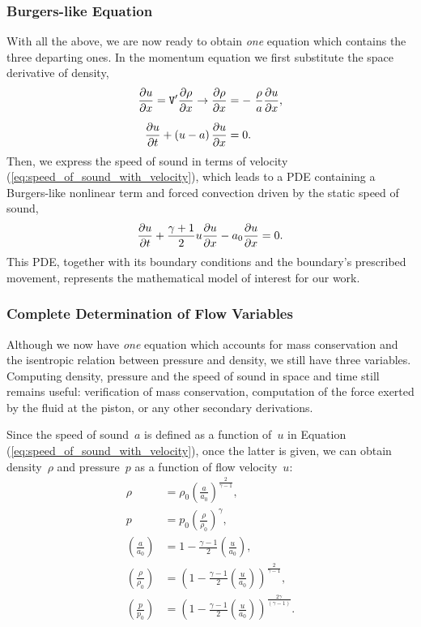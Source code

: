 \documentclass[../../thesis.tex]{subfiles}
\begin{document}
\subsubsection{Burgers-like Equation}
With all the above, we are now ready to obtain \textit{one} equation which contains the three departing ones.
In the momentum equation we first substitute the space derivative of density,
\begin{subequations}
    \begin{align}
        \pdv{u}{x} = \mathtt{V}' \pdv{\rho}{x} \rightarrow \pdv{\rho}{x} &= - \frac{\rho}{a} \pdv{u}{x},
        \\[2mm]
        \pdv{u}{t} + \left(u-a\right)\pdv{u}{x} &= 0.
    \end{align}    
\end{subequations}
Then, we express the speed of sound in terms of velocity (\ref{eq:speed_of_sound_with_velocity}),
which leads to a PDE containing a Burgers-like nonlinear term and 
forced convection driven by the static speed of sound, 
\begin{equation}
    \pdv{u}{t} + \frac{\gamma+1}{2}u \pdv{u}{x} - a_0\pdv{u}{x} = 0.
\end{equation}
This PDE, together with its boundary conditions and the boundary's prescribed movement, represents the mathematical model of interest for our work. 

\subsubsection{Complete Determination of Flow Variables}
Although we now have \textit{one} equation which accounts for mass conservation and the isentropic relation between pressure and density, we still have three variables. 
Computing density, pressure and the speed of sound in space and time still remains useful: 
verification of mass conservation, computation of the force exerted by the fluid at the piston, or any other secondary derivations.

Since the speed of sound~$a$ is defined as a function of~$u$ in Equation (\ref{eq:speed_of_sound_with_velocity}),
once the latter is given, we can obtain density~$\rho$ and pressure~$p$ as a function of flow velocity~$u$:
\begin{subequations}
    \begin{align}
        \rho &= \rho_0 \left(\frac{a}{a_0}\right)^{\frac{2}{\gamma-1}},
        \\
        p    &= p_0 \left(\frac{\rho}{\rho_0}\right)^{\gamma},
        \\[2mm]
        \left(\frac{a}{a_0}\right) &= 1 - \frac{\gamma-1}{2}\left(\frac{u}{a_0}\right), 
        \\[2mm]
        \left(\frac{\rho}{\rho_0}\right) &= \left(1 - \frac{\gamma-1}{2}\left(\frac{u}{a_0}\right)\right)^{\frac{2}{\gamma-1}},
        \label{eq:density_as_a_function_of_speed}
        \\[2mm]
        \left(\frac{p}{p_0}\right) &= \left(1 - \frac{\gamma-1}{2}\left(\frac{u}{a_0}\right)\right)^{\frac{2\gamma}{\left(\gamma-1\right)}}.
    \end{align}
\end{subequations}
\end{document}
